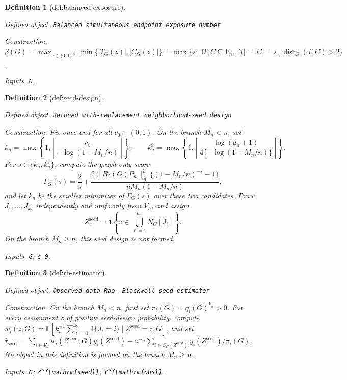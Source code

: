 \documentclass{article}
\newtheorem{definition}{Definition}
\begin{document}
\begin{definition}[def:balanced-exposure]\label{def:balanced-exposure}
\par\smallskip\noindent\emph{Defined object.} \texttt{Balanced simultaneous endpoint exposure number}
\par\smallskip\noindent\emph{Construction.} \(\beta(G)=\max_{z\in\{0,1\}^{V_n}}\min\{|T_G(z)|,|C_G(z)|\}=\max\{s:\exists T,C\subseteq V_n,\ |T|=|C|=s,\ \operatorname{dist}_G(T,C)>2\}\).
\par\smallskip\noindent\emph{Inputs.} \texttt{G}.
\end{definition}

\begin{definition}[def:seed-design]\label{def:seed-design}
\par\smallskip\noindent\emph{Defined object.} \texttt{Retuned with-\allowbreak{}replacement neighborhood-\allowbreak{}seed design}
\par\smallskip\noindent\emph{Construction.} Fix once and for all \(c_0\in(0,1)\).  On the branch \(M_n<n\), set
\[
\widetilde k_n=\max\!\left\{1,\left\lfloor\frac{c_0}{-\log(1-M_n/n)}\right\rfloor\right\},
\qquad
k_n^\sharp=\max\!\left\{1,\left\lfloor
\frac{\log(d_n+1)}{4\{-\log(1-M_n/n)\}}
\right\rfloor\right\}.
\]
For \(s\in\{\widetilde k_n,k_n^\sharp\}\), compute the graph-only score
\[
\Gamma_G(s)=\frac2s+
\frac{2\|B_2(G)P_n\|_{\mathrm{op}}^2\{(1-M_n/n)^{-s}-1\}}
{nM_n(1-M_n/n)},
\]
and let \(k_n\) be the smaller minimizer of \(\Gamma_G(s)\) over these two candidates.  Draw \(J_1,\ldots,J_{k_n}\) independently and uniformly from \(V_n\), and assign
\[
Z^{\mathrm{seed}}_v=\mathbf 1\!\left\{v\in\bigcup_{\ell=1}^{k_n}N_G[J_\ell]\right\}.
\]
On the branch \(M_n\ge n\), this seed design is not formed.
\par\smallskip\noindent\emph{Inputs.} \texttt{G}; \texttt{c\_\allowbreak{}0}.
\end{definition}

\begin{definition}[def:rb-estimator]\label{def:rb-estimator}
\par\smallskip\noindent\emph{Defined object.} \texttt{Observed-\allowbreak{}data Rao-\allowbreak{}-\allowbreak{}Blackwell seed estimator}
\par\smallskip\noindent\emph{Construction.} On the branch \(M_n<n\), first set \(\pi_i(G)=q_i(G)^{k_n}>0\). For every assignment \(z\) of positive seed-design probability, compute \(w_i(z;G)=\mathbb E[k_n^{-1}\sum_{\ell=1}^{k_n}\mathbf 1\{J_\ell=i\}\mid Z^{\mathrm{seed}}=z,G]\), and set \(\widehat\tau_{\mathrm{seed}}=\sum_{i\in V_n}w_i(Z^{\mathrm{seed}};G)y_i(Z^{\mathrm{seed}})-n^{-1}\sum_{i\in C_G(Z^{\mathrm{seed}})}y_i(Z^{\mathrm{seed}})/\pi_i(G)\). No object in this definition is formed on the branch \(M_n\ge n\).
\par\smallskip\noindent\emph{Inputs.} \texttt{G}; \texttt{Z\textasciicircum{}\{\textbackslash{}\allowbreak{}mathrm\{seed\}\allowbreak{}\}\allowbreak{}}; \texttt{Y\textasciicircum{}\{\textbackslash{}\allowbreak{}mathrm\{obs\}\allowbreak{}\}\allowbreak{}}.
\end{definition}
\end{document}
